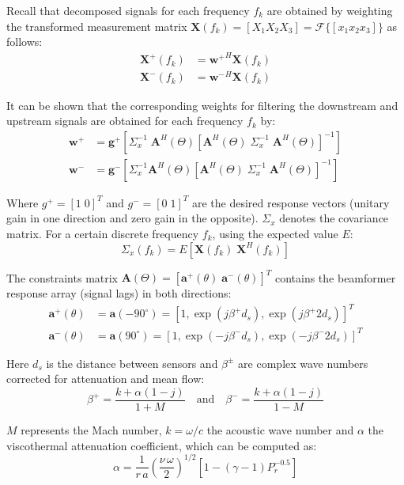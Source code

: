 Recall that decomposed signals for each frequency $f_k$ are obtained by weighting the transformed measurement matrix $\mathbf X(f_k)=[X_1 X_2 X_3]=\mathcal F\{[x_1 x_2 x_3]\}$ as follows:
\begin{align}
    \mathbf X^+(f_k)&=\mathbf {w^+}^H\mathbf X(f_k)\\
    \mathbf X^-(f_k)&=\mathbf {w^-}^H\mathbf X(f_k)
\end{align}

It can be shown that the corresponding weights for filtering the downstream and upstream signals are obtained for each frequency $f_k$ by:
\begin{align}
    \mathbf w^+ &=\mathbf g^+\left[ \Sigma^{-1}_x\; \mathbf A^H(\Theta)\left[\mathbf A^H(\Theta)\; \Sigma^{-1}_x\; \mathbf A^H(\Theta)\right]^{-1}\right]\\
    \mathbf w^- &=\mathbf g^-\left[ \Sigma^{-1}_x \mathbf A^H(\Theta)\left[\mathbf A^H(\Theta)\; \Sigma^{-1}_x\; \mathbf A^H(\Theta)\right]^{-1}\right]
\end{align}

Where $g^+=[1\;0]^T$ and $g^-=[0\;1]^T$ are the desired response vectors (unitary gain in one direction and zero gain in the opposite). $\Sigma_x$ denotes the covariance matrix. For a certain discrete frequency $f_k$, using the expected value $E$:
\begin{equation}
  \Sigma_x(f_k)=E[\mathbf X(f_k)\;\mathbf X^H(f_k)]
\end{equation}

The constraints matrix $\mathbf A(\Theta)=[\mathbf a^+(\theta)\; \mathbf a^-(\theta)]^T$ contains the beamformer response array (signal lags) in both directions:
\begin{align}
    \mathbf a^+(\theta) &= \mathbf a(-90^\circ)=\left[1,\exp(j\beta^+d_s),\exp(j\beta^+2d_s)\right]^T\\
    \mathbf a^-(\theta) &= \mathbf a(90^\circ)=\left[1,\exp(-j\beta^-d_s),\exp(-j\beta^-2d_s)\right]^T
\end{align}

Here $d_s$ is the distance between sensors and $\beta^\pm$ are complex wave numbers corrected for attenuation and mean flow:
\begin{equation}
    \beta^+=\frac{k+\alpha(1-j)}{1+M}\quad\text{and}\quad\beta^-=\frac{k+\alpha(1-j)}{1-M}
\end{equation}

$M$ represents the Mach number, $k=\omega/c$ the acoustic wave number and $\alpha$ the viscothermal attenuation coefficient, which can be computed as:
\begin{equation}
  \alpha=\frac{1}{r\,a}\left(\frac{\nu\,\omega}{2}\right)^{1/2}\left[1-(\gamma-1)P_r^{-0.5}\right]
\end{equation}

